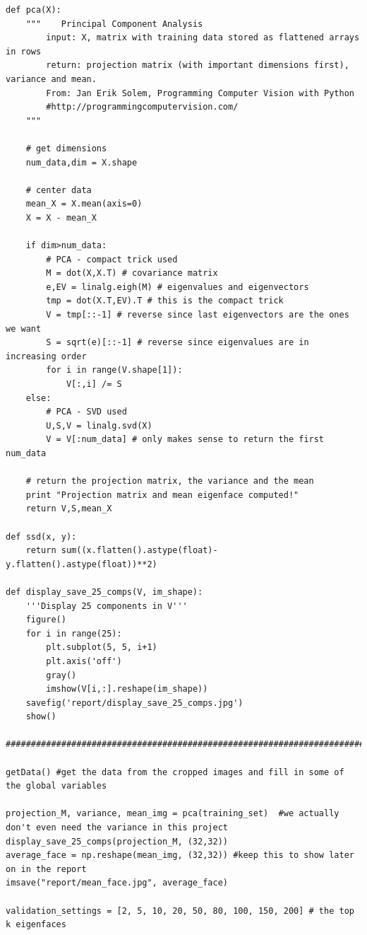 \documentclass{article}
\begin{document}
\begin{lstlisting}
def pca(X):
    """    Principal Component Analysis
        input: X, matrix with training data stored as flattened arrays in rows
        return: projection matrix (with important dimensions first), variance and mean.
        From: Jan Erik Solem, Programming Computer Vision with Python
        #http://programmingcomputervision.com/
    """
    
    # get dimensions
    num_data,dim = X.shape
    
    # center data
    mean_X = X.mean(axis=0)
    X = X - mean_X
    
    if dim>num_data:
        # PCA - compact trick used
        M = dot(X,X.T) # covariance matrix
        e,EV = linalg.eigh(M) # eigenvalues and eigenvectors
        tmp = dot(X.T,EV).T # this is the compact trick
        V = tmp[::-1] # reverse since last eigenvectors are the ones we want
        S = sqrt(e)[::-1] # reverse since eigenvalues are in increasing order
        for i in range(V.shape[1]):
            V[:,i] /= S
    else:
        # PCA - SVD used
        U,S,V = linalg.svd(X)
        V = V[:num_data] # only makes sense to return the first num_data
    
    # return the projection matrix, the variance and the mean
    print "Projection matrix and mean eigenface computed!"
    return V,S,mean_X
    
def ssd(x, y):
    return sum((x.flatten().astype(float)-y.flatten().astype(float))**2)    
    
def display_save_25_comps(V, im_shape):
    '''Display 25 components in V'''
    figure()
    for i in range(25):
        plt.subplot(5, 5, i+1)
        plt.axis('off')
        gray()
        imshow(V[i,:].reshape(im_shape))
    savefig('report/display_save_25_comps.jpg')  
    show()        

##########################################################################################################################################

getData() #get the data from the cropped images and fill in some of the global variables

projection_M, variance, mean_img = pca(training_set)  #we actually don't even need the variance in this project
display_save_25_comps(projection_M, (32,32))
average_face = np.reshape(mean_img, (32,32)) #keep this to show later on in the report
imsave("report/mean_face.jpg", average_face)

validation_settings = [2, 5, 10, 20, 50, 80, 100, 150, 200] # the top k eigenfaces


\end{lstlisting}
\end{document}
